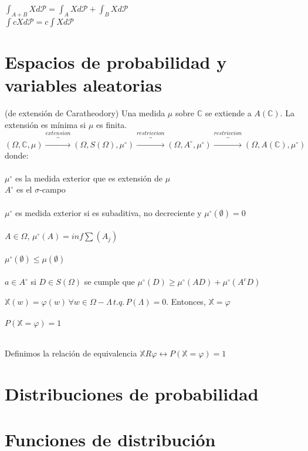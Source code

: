\documentclass[12pt,a4paper]{book}
\begin{document}
$\displaystyle \int_{A+B} X d\mathcal{P} = \int_A X d\mathcal{P} + \int_B X d \mathcal{P}$\\

$\displaystyle \int cXd\mathcal{P} = c\int Xd\mathcal{P}$


\section{Espacios de probabilidad y variables aleatorias}
\begin{theorem} (de extensión de Caratheodory) 
Una medida $\mu$ sobre $\mathbb{C}$ se extiende a $A(\mathbb{C})$. La extensión es mínima si $\mu$ es finita.
$$(\Omega,\mathbb{C},\mu)\overbrace{\longrightarrow}^{extension}(\Omega,S(\Omega),\mu^\circ)\overbrace{\longrightarrow}^{restriccion}(\Omega,A^\circ,\mu^\circ)\overbrace{\longrightarrow}^{restriccion}(\Omega,A(\mathbb{C}),\mu^\circ)$$
donde:\\\\
$\mu^\circ$ es la medida exterior que es extensión de $\mu$\\
$A^\circ$ es el $\sigma$-campo\\\\
$\mu^\circ$ es medida exterior si es subaditiva, no decreciente y $\mu^\circ(\emptyset)=0$
\\\\
$A\in \Omega$, $\mu^\circ(A)=inf\displaystyle\sum(A_j)$\\\\
$\mu^\circ(\emptyset)\leq\mu(\emptyset)$\\\\
$a\in A^\circ$ si $D\in S(\Omega)$ se cumple que $\mu^\circ(D)\geq\mu^\circ(AD)+\mu^\circ(A^c D)$
\end{theorem}

\begin{lemma} 
$\mathbb{X}(w)=\varphi(w)\,\forall w \in \Omega - \Lambda\, t.q.\, P(\Lambda)=0$. Entonces, $\mathbb{X}=\varphi$ \\\\
$P(\mathbb{X}=\varphi)=1$\\\\
\end{lemma}
Definimos la relación de equivalencia $\mathbb{X}R\varphi\leftrightarrow P(\mathbb{X}=\varphi)=1$
\section{Distribuciones de probabilidad}
\section{Funciones de distribución}
\end{document}
